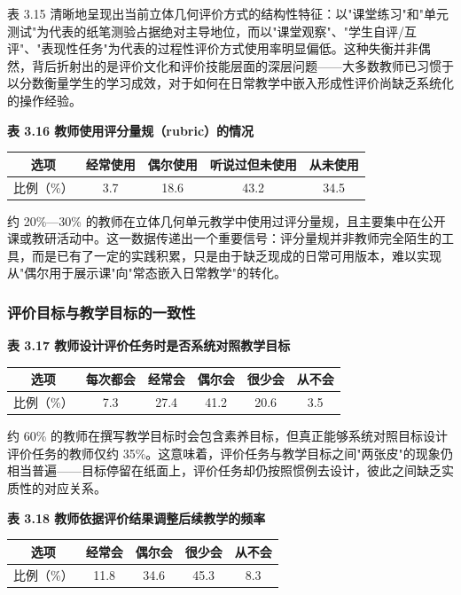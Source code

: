 \documentclass[UTF8,a4paper,12pt,twoside]{ctexart}
\begin{document}
表 3.15 清晰地呈现出当前立体几何评价方式的结构性特征：以"课堂练习"和"单元测试"为代表的纸笔测验占据绝对主导地位，而以"课堂观察"、"学生自评/互评"、"表现性任务"为代表的过程性评价方式使用率明显偏低。这种失衡并非偶然，背后折射出的是评价文化和评价技能层面的深层问题——大多数教师已习惯于以分数衡量学生的学习成效，对于如何在日常教学中嵌入形成性评价尚缺乏系统化的操作经验。

\textbf{表 3.16 教师使用评分量规（rubric）的情况}

\begin{center}
\begin{tabular}{|c|c|c|c|c|}
\hline
选项 & 经常使用 & 偶尔使用 & 听说过但未使用 & 从未使用 \\
\hline
比例（\%） & 3.7 & 18.6 & 43.2 & 34.5 \\
\hline
\end{tabular}
\end{center}

约 20\%—30\% 的教师在立体几何单元教学中使用过评分量规，且主要集中在公开课或教研活动中。这一数据传递出一个重要信号：评分量规并非教师完全陌生的工具，而是已有了一定的实践积累，只是由于缺乏现成的日常可用版本，难以实现从"偶尔用于展示课"向"常态嵌入日常教学"的转化。

\subsubsection{评价目标与教学目标的一致性}

\textbf{表 3.17 教师设计评价任务时是否系统对照教学目标}

\begin{center}
\begin{tabular}{|c|c|c|c|c|c|}
\hline
选项 & 每次都会 & 经常会 & 偶尔会 & 很少会 & 从不会 \\
\hline
比例（\%） & 7.3 & 27.4 & 41.2 & 20.6 & 3.5 \\
\hline
\end{tabular}
\end{center}

约 60\% 的教师在撰写教学目标时会包含素养目标，但真正能够系统对照目标设计评价任务的教师仅约 35\%。这意味着，评价任务与教学目标之间"两张皮"的现象仍相当普遍——目标停留在纸面上，评价任务却仍按照惯例去设计，彼此之间缺乏实质性的对应关系。

\textbf{表 3.18 教师依据评价结果调整后续教学的频率}

\begin{center}
\begin{tabular}{|c|c|c|c|c|}
\hline
选项 & 经常会 & 偶尔会 & 很少会 & 从不会 \\
\hline
比例（\%） & 11.8 & 34.6 & 45.3 & 8.3 \\
\hline
\end{tabular}
\end{center}
\end{document}
